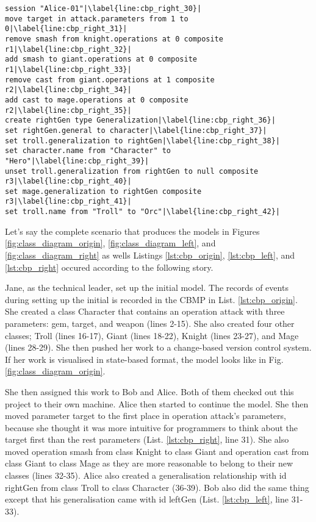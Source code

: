 \begin{lstlisting}[firstnumber=30,style=eol,escapechar=|,caption={The appended events made by Alice to produce the right version in Fig. \ref{fig:class_diagram_right} (right version).},label=lst:cbp_right]
session "Alice-01"|\label{line:cbp_right_30}|
move target in attack.parameters from 1 to 0|\label{line:cbp_right_31}|
remove smash from knight.operations at 0 composite r1|\label{line:cbp_right_32}|
add smash to giant.operations at 0 composite r1|\label{line:cbp_right_33}|
remove cast from giant.operations at 1 composite r2|\label{line:cbp_right_34}|
add cast to mage.operations at 0 composite r2|\label{line:cbp_right_35}|
create rightGen type Generalization|\label{line:cbp_right_36}|
set rightGen.general to character|\label{line:cbp_right_37}|
set troll.generalization to rightGen|\label{line:cbp_right_38}|
set character.name from "Character" to "Hero"|\label{line:cbp_right_39}|
unset troll.generalization from rightGen to null composite r3|\label{line:cbp_right_40}|
set mage.generalization to rightGen composite r3|\label{line:cbp_right_41}|
set troll.name from "Troll" to "Orc"|\label{line:cbp_right_42}|
\end{lstlisting}

 Let's say the complete scenario that produces the models in Figures \ref{fig:class_diagram_origin}, \ref{fig:class_diagram_left}, and \ref{fig:class_diagram_right} as wells Listings \ref{lst:cbp_origin}, \ref{lst:cbp_left}, and \ref{lst:cbp_right} occured according to the following story.

Jane, as the technical leader, set up the initial model. The records of events during setting up the initial is recorded in the CBMP in List. \ref{lst:cbp_origin}. She created a class \textsf{Character} that contains an operation \textsf{attack} with three parameters: \textsf{gem}, \textsf{target}, and \textsf{weapon} (lines 2-15). She also created four other classes; \textsf{Troll} (lines 16-17), \textsf{Giant} (lines 18-22), \textsf{Knight} (lines 23-27), and \textsf{Mage} (lines 28-29). She then pushed her work to a change-based version control system. If her work is visualised in state-based format, the model looks like in Fig. \ref{fig:class_diagram_origin}.

She then assigned this work to Bob and Alice. Both of them checked out this project to their own machine. Alice then started to continue the model. She then moved parameter \textsf{target} to the first place in operation \textsf{attack}'s parameters, because she thought it was more intuitive for programmers to think about the \textsf{target} first than the rest parameters (List. \ref{lst:cbp_right}, line 31). She also moved operation \textsf{smash} from class \textsf{Knight} to class \textsf{Giant} and operation \textsf{cast} from class \textsf{Giant} to class \textsf{Mage} as they are more reasonable to belong to their new classes (lines 32-35). Alice also created a generalisation relationship with id \textsf{rightGen} from class \textsf{Troll} to class \textsf{Character} (36-39). Bob also did the same thing except that his generalisation came with id \textsf{leftGen} (List. \ref{lst:cbp_left}, line 31-33). 


